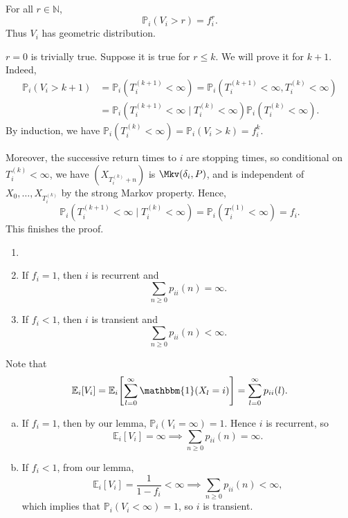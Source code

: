 \documentclass[12pt]{article}
\begin{document}
\begin{lemma}
	For all $r \in \mathbb{N}$,
	\[
		\mathbb{P}_i(V_i > r) = f_i^{r}
	.\]
	Thus $V_i$ has geometric distribution.
\end{lemma}

\begin{proofbox}
	$r = 0$ is trivially true. Suppose it is true for $r \leq k$. We will prove it for $k + 1$. Indeed,
\begin{align*}
	\mathbb{P}_i(V_i > k+1) &= \mathbb{P}_i(T_i^{(k+1)} < \infty) = \mathbb{P}_i(T_i^{(k+1)}< \infty, T_i^{(k)} < \infty) \\
				&= \mathbb{P}_i(T_i^{(k+1)} < \infty \mid T_i^{(k)} < \infty) \mathbb{P}_i(T_i^{(k)} < \infty).
\end{align*}
By induction, we have $\mathbb{P}_i(T_i^{(k)} < \infty) = \mathbb{P}_i(V_i > k) = f_i^{k}$.

Moreover, the successive return times to $i$ are stopping times, so conditional on $T_i^{(k)} < \infty$, we have $(X_{T_i^{(k)} + n})$ is $\Mkv(\delta_i, P)$, and is independent of $X_0, \ldots, X_{T_i^{(k)}}$ by the strong Markov property. Hence,
\[
	\mathbb{P}_i(T_i^{(k+1)} < \infty \mid T_i^{(k)} < \infty) = \mathbb{P}_i(T_i^{(1)} < \infty) = f_i
.\]
This finishes the proof.
\end{proofbox}

\begin{theorem}
	\begin{enumerate}[\normalfont(a)]
		\item[]
		\item If $f_i = 1$, then $i$ is recurrent and
			\[
				\sum_{n \geq 0} p_{ii}(n) = \infty
			.\]
		\item If $f_i < 1$, then $i$ is transient and
			\[
				\sum_{n \geq 0} p_{ii}(n) < \infty
			.\]
	\end{enumerate}
\end{theorem}

\begin{proofbox}
	Note that
\[
	\mathbb{E}_i[V_i] = \mathbb{E}_i\Biggl[\sum_{l = 0}^{\infty} \mathbbm{1}(X_l = i) \Biggr] = \sum_{l = 0}^{\infty} p_{ii}(l)
.\]
\begin{enumerate}[(a)]
	\item If $f_i = 1$, then by our lemma, $\mathbb{P}_i(V_i = \infty) = 1$. Hence $i$ is recurrent, so
		\[
			\mathbb{E}_i[V_i] = \infty \implies \sum_{n \geq 0} p_{ii}(n) = \infty
		.\]
	\item If $f_i < 1$, from our lemma,
		\[
			\mathbb{E}_i[V_i] = \frac{1}{1 - f_i} < \infty \implies \sum_{n \geq 0} p_{ii}(n) < \infty
		,\]
		which implies that $\mathbb{P}_i(V_i < \infty) = 1$, so $i$ is transient.
\end{enumerate}
\end{proofbox}
\end{document}
